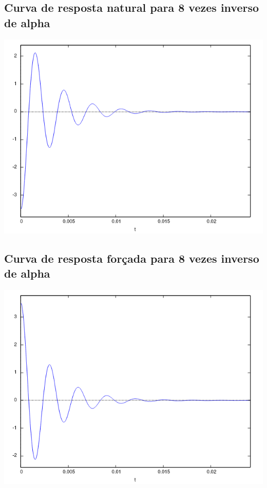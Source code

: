 \documentclass[12pt,twoside, a4paper, twocolumn]{article}
\begin{document}
{\subsection{Curva de resposta natural para 8 vezes inverso de alpha}

\begin{adjustbox}{scale=0.55}
    \includegraphics{Figure_3.png}
\end{adjustbox}


\subsection{Curva de resposta forçada para 8 vezes inverso de alpha}

\begin{adjustbox}{scale=0.55}
    \includegraphics{Figure_4.png}
\end{adjustbox}

}
\end{document}
